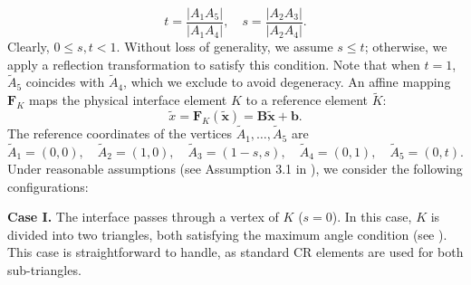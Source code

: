 \documentclass[a4paper,11pt,fleqn]{article}
\numberwithin{equation}{section}
\begin{document}
\begin{equation*}
	t = \frac{|A_1A_5|}{|A_1A_4|}, \quad s =  \frac{|A_2A_3|}{|A_2A_4|}.
\end{equation*}
Clearly, $0 \leq s, t < 1$. Without loss of generality, we assume $s \leq t$; otherwise, we apply a reflection transformation to satisfy this condition. Note that when $t = 1$, $\tilde{A}_5$ coincides with $\tilde{A}_4$, which we exclude to avoid degeneracy. An affine mapping $\bm{F}_K$ maps the physical interface element $K$ to a reference element $\tilde{K}$:
\begin{equation}
	\tilde{x} = \bm{F}_K(\tilde{\bm{x}}) = \bm{B} \tilde{\bm{x}} + \bm{b}.
\end{equation}
The reference coordinates of the vertices $\tilde{A}_1, \dots, \tilde{A}_5$ are
\begin{equation*}
	\tilde{A}_1 = (0, 0),\quad \tilde{A}_2 = (1, 0),\quad \tilde{A}_3 = (1 - s, s),\quad \tilde{A}_4 = (0, 1),\quad \tilde{A}_5 = (0, t).
\end{equation*}
Under reasonable assumptions (see Assumption 3.1 in \cite{Ji2023}), we consider the following configurations: 

\textbf{Case I.} The interface passes through a vertex of $K$ ($s = 0$). In this case, $K$ is divided into two triangles, both satisfying the maximum angle condition (see \cite{Hu2021optimal}). This case is straightforward to handle, as standard CR elements are used for both sub-triangles.
\end{document}
